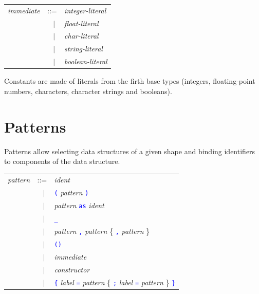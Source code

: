 \documentclass[11pt,titlepage,twoside]{report}
\newcommand{\alt}{\;|\;}
\newcommand{\term}[1]{\textcolor{Blue}{\tt #1}}
\newcommand{\nterm}[1]{\textcolor{BrickRed}{\it #1}}
\newcommand{\term}[1]{{\tt #1}}
\newcommand{\nterm}[1]{{\em #1}}
\begin{document}
\begin{center}
\begin{tabular}{lcl}
\nterm{immediate} & ::=           & \nterm{integer-literal} \\
                  & $\;\;\alt$    & \nterm{float-literal} \\
                  & $\;\;\alt$    & \nterm{char-literal} \\
                  & $\;\;\alt$    & \nterm{string-literal} \\
                  & $\;\;\alt$    & \nterm{boolean-literal} \\
\end{tabular}
\end{center}
Constants are made of literals from the firth base types (integers,
floating-point numbers, characters, character strings and booleans).

\section{Patterns\label{patterns}} %

Patterns allow selecting data structures of a given shape and binding
identifiers to components of the data structure.

\begin{center}
\begin{tabular}{lcl}
\nterm{pattern} & ::=        & \nterm{ident} \\
                & $\;\;\alt$ & \term{(} \nterm{pattern} \term{)} \\
                & $\;\;\alt$ & \nterm{pattern} \term{as} \nterm{ident} \\
                & $\;\;\alt$ & \term{\_} \\
                & $\;\;\alt$ & \nterm{pattern} \term{,} \nterm{pattern} 
                               \{ \term{,} \nterm{pattern} \} \\
                & $\;\;\alt$ & \term{()} \\
                & $\;\;\alt$ & \nterm{immediate} \\
                & $\;\;\alt$ & \nterm{constructor} \\
                & $\;\;\alt$ & \term{\{} \nterm{label} 
                               \term{=} \nterm{pattern} \{ \term{;} 
                               \nterm{label} \term{=} \nterm{pattern}
                               \} \term{\}}
\end{tabular}
\end{center}
\end{document}

